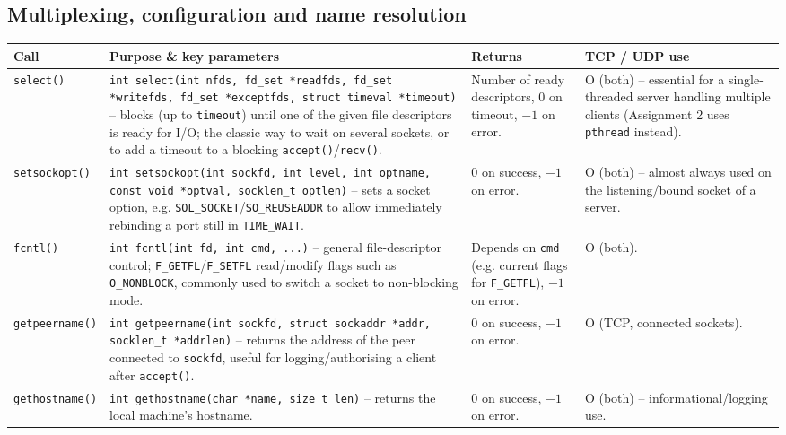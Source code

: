 \documentclass[11pt,a4paper]{article}
\begin{document}
\subsection{Multiplexing, configuration and name resolution}

\begin{longtable}{|p{2.6cm}|p{6.6cm}|p{2cm}|p{3.6cm}|}
\hline
\textbf{Call} & \textbf{Purpose \& key parameters} & \textbf{Returns} & \textbf{TCP / UDP use} \\ \hline
\endhead

\texttt{select()} &
\texttt{int select(int nfds, fd\_set *readfds, fd\_set *writefds, fd\_set *exceptfds,
struct timeval *timeout)} -- blocks (up to \texttt{timeout}) until one of the given file
descriptors is ready for I/O; the classic way to wait on several sockets, or to add a
timeout to a blocking \texttt{accept()}/\texttt{recv()}. &
Number of ready descriptors, $0$ on timeout, $-1$ on error. &
O (both) -- essential for a single-threaded server handling multiple clients (Assignment 2
uses \texttt{pthread} instead). \\ \hline

\texttt{setsockopt()} &
\texttt{int setsockopt(int sockfd, int level, int optname, const void *optval, socklen\_t
optlen)} -- sets a socket option, e.g. \texttt{SOL\_SOCKET}/\texttt{SO\_REUSEADDR} to allow
immediately rebinding a port still in \texttt{TIME\_WAIT}. &
$0$ on success, $-1$ on error. &
O (both) -- almost always used on the listening/bound socket of a server. \\ \hline

\texttt{fcntl()} &
\texttt{int fcntl(int fd, int cmd, ...)} -- general file-descriptor control;
\texttt{F\_GETFL}/\texttt{F\_SETFL} read/modify flags such as \texttt{O\_NONBLOCK}, commonly
used to switch a socket to non-blocking mode. &
Depends on \texttt{cmd} (e.g. current flags for \texttt{F\_GETFL}), $-1$ on error. &
O (both). \\ \hline

\texttt{getpeername()} &
\texttt{int getpeername(int sockfd, struct sockaddr *addr, socklen\_t *addrlen)} -- returns
the address of the peer connected to \texttt{sockfd}, useful for logging/authorising a
client after \texttt{accept()}. &
$0$ on success, $-1$ on error. &
O (TCP, connected sockets). \\ \hline

\texttt{gethostname()} &
\texttt{int gethostname(char *name, size\_t len)} -- returns the local machine's hostname. &
$0$ on success, $-1$ on error. &
O (both) -- informational/logging use. \\ \hline


\end{longtable}
\end{document}
